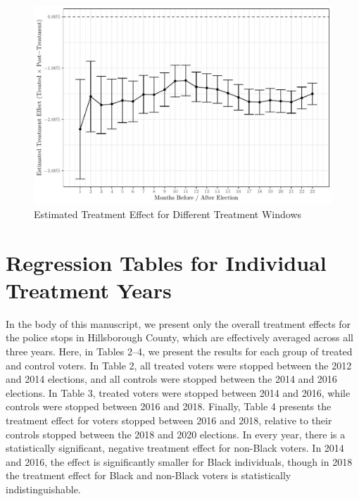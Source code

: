 \documentclass[
  12pt,
]{article}
\begin{document}
\begin{figure}[!htb]

{\centering \includegraphics{si_files/figure-latex/windows-1} 

}

\caption{\label{fig:rob-window}Estimated Treatment Effect for Different Treatment Windows}\label{fig:windows}
\end{figure}

\hypertarget{regression-tables-for-individual-treatment-years}{%
\section*{Regression Tables for Individual Treatment Years}\label{regression-tables-for-individual-treatment-years}}

In the body of this manuscript, we present only the overall treatment effects for the police stops in Hillsborough County, which are effectively averaged across all three years. Here, in Tables 2--4, we present the results for each group of treated and control voters. In Table 2, all treated voters were stopped between the 2012 and 2014 elections, and all controls were stopped between the 2014 and 2016 elections. In Table 3, treated voters were stopped between 2014 and 2016, while controls were stopped between 2016 and 2018. Finally, Table 4 presents the treatment effect for voters stopped between 2016 and 2018, relative to their controls stopped between the 2018 and 2020 elections. In every year, there is a statistically significant, negative treatment effect for non-Black voters. In 2014 and 2016, the effect is significantly smaller for Black individuals, though in 2018 the treatment effect for Black and non-Black voters is statistically indistinguishable.
\end{document}
